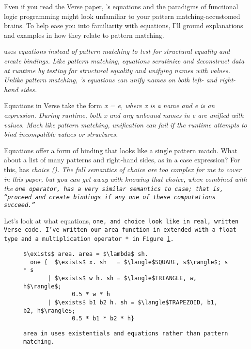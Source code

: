 \documentclass[manuscript,screen,review, 12pt, nonacm]{acmart}
\begin{document}
    Even if you read the Verse paper, \VC's equations and the paradigms of
    functional logic programming might look unfamiliar to your pattern
    matching-accustomed brains. To help ease you into familiarity with
    equations, I'll ground explanations and examples in how they relate to
    pattern matching. 

    \VC uses \it{equations} instead of pattern matching to test for structural
    equality and create bindings. Like pattern matching, equations scrutinize
    and deconstruct data at runtime by testing for structural equality and
    unifying names with values. Unlike pattern matching, \VC's equations can
    unify names on both left- \it{and} right-hand sides. 

    Equations in Verse take the form \it{x = e}, where \it{x} is a name and
    \it{e} is an expression. During runtime, both \it{x} and any unbound names
    in \it{e} are unified with values. Much like pattern matching, unification
    can fail if the runtime attempts to bind incompatible values or structures. 

    Equations offer a form of binding that looks like a single pattern match.
    What about a list of many patterns and right-hand sides, as in a case
    expression? For this, \VC has \it{choice} (\choice). The full semantics of
    choice are too complex for me to cover in this paper, but you can get away
    with knowing that choice, when combined with the \tt{one} operator, has a
    very similar semantics to case; that is, “proceed and create bindings if any
    one of these computations succeed.” 

    Let's look at what equations, \tt{one}, and choice look like in real,
    written Verse code. I've written our \tt{area} function in \VC extended
    with a \tt{float} type and a multiplication operator \tt{*} in
    Figure~\ref{fig:versearea}. 

    \begin{figure}[]
        \verselst
        \begin{lstlisting}[numbers=none]
$\exists$ area. area = $\lambda$ sh. 
  one {  $\exists$ x. sh   = $\langle$SQUARE, s$\rangle$; s * s
       | $\exists$ w h. sh = $\langle$TRIANGLE, w, h$\rangle$; 
              0.5 * w * h
       | $\exists$ b1 b2 h. sh = $\langle$TRAPEZOID, b1, b2, h$\rangle$; 
              0.5 * b1 * b2 * h}
        \end{lstlisting}
    \caption{\tt{area} in \VC uses existentials and equations rather than
    pattern matching.} 
    \label{fig:versearea}
    \end{figure}
\end{document}
